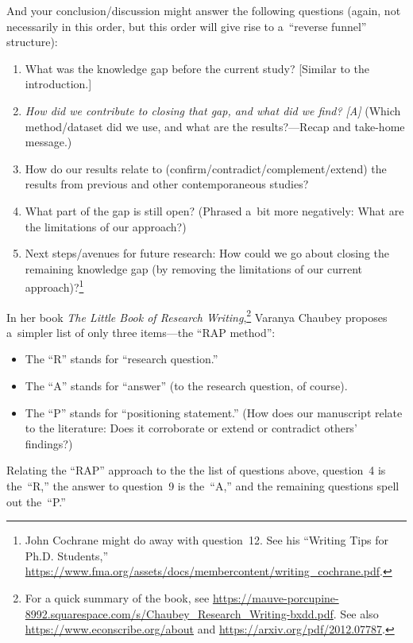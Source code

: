 And your conclusion/discussion might answer the following questions (again, not necessarily in this order, but this order will give rise to a~``reverse funnel'' structure):
\begin{enumerate}[resume, labelindent = \parindent, leftmargin = 2\parindent]
	\item What was the knowledge gap before the current study? [Similar to the introduction.]
	\item \emph{How did we contribute to closing that gap, and what did we find? [A]} (Which method\slash dataset did we use, and what are the results?---Recap and take-home message.)
	\item How do our results relate to (confirm\slash contradict\slash complement\slash extend) the results from previous and other contemporaneous studies?
	\item What part of the gap is still open? (Phrased a~bit more negatively: What are the limitations of our approach?)
	\item Next steps\slash avenues for future research: How could we go about closing the remaining knowledge gap (by removing the limitations of our current approach)?\footnote{John Cochrane might do away with question~12. See his ``Writing Tips for Ph.D. Students,'' \url{https://www.fma.org/assets/docs/membercontent/writing_cochrane.pdf}.}
\end{enumerate}

In her book \textit{The Little Book of Research Writing},\footnote{For a quick summary of the book, see \url{https://mauve-porcupine-8992.squarespace.com/s/Chaubey_Research_Writing-bxdd.pdf}. See also \url{https://www.econscribe.org/about} and \url{https://arxiv.org/pdf/2012.07787}.} Varanya Chaubey proposes a~simpler list of only three items---the ``RAP method'':
\begin{itemize}
	\item The ``R'' stands for ``research question.''
	\item The ``A'' stands for ``answer'' (to the research question, of course).
	\item The ``P'' stands for ``positioning statement.'' (How does our manuscript relate to the literature: Does it corroborate or extend or contradict others' findings?)
\end{itemize}

Relating the ``RAP'' approach to the the list of questions above, question~4 is the~``R,'' the answer to question~9 is the~``A,'' and the remaining questions spell out the~``P.''


